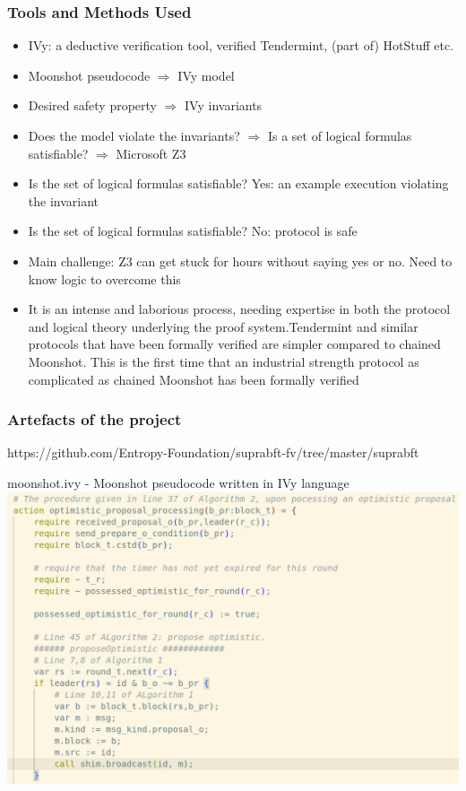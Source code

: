 \documentclass{beamer}
\begin{document}
\begin{frame}
    \frametitle{Tools and Methods Used}
    \begin{itemize}
        \item \alert{IVy}: a deductive
            verification tool, verified Tendermint, (part of) HotStuff etc.
            \pause
            \vfill
        \item Moonshot pseudocode $\Rightarrow$ IVy model
            \pause
            \vfill
        \item Desired safety property $\Rightarrow$ IVy invariants
            \pause
            \vfill
        \item Does the model violate the invariants? $\Rightarrow$ Is a set of
            logical formulas satisfiable? \pause $\Rightarrow$ Microsoft Z3
            \pause
            \vfill
        \item Is the set of logical formulas satisfiable? \alert{Yes}:
            an example execution violating the invariant
            \pause
            \vfill
        \item Is the set of logical formulas satisfiable? \alert{No}:
            protocol is safe
            \pause
            \vfill
        \item Main challenge: Z3 can get stuck for hours without
            saying yes or no. \pause Need to know logic to overcome
            this
            \pause
            \vfill
        \item It is an intense and laborious process, needing expertise in both the protocol and logical theory underlying the proof system.\pause Tendermint and similar protocols that have been formally verified are simpler compared to chained Moonshot. This is the first time that an industrial strength protocol as complicated as chained Moonshot has been formally verified
    \end{itemize}
\end{frame}

\begin{frame}
    \frametitle{Artefacts of the project}
     https://github.com/Entropy-Foundation/suprabft-fv/tree/master/suprabft    

     \alert{moonshot.ivy} - Moonshot pseudocode written in IVy
     language\\
     \includegraphics[scale=0.25]{OptimisticPropProc.png}
\end{frame}
\end{document}
